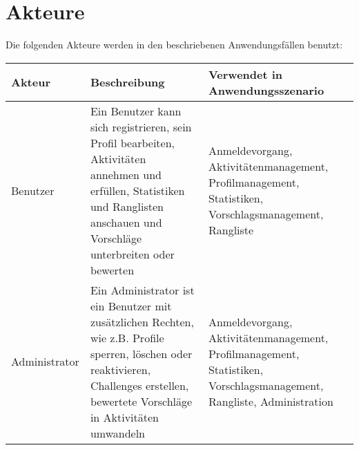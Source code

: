 \section{Akteure}
Die folgenden Akteure werden in den beschriebenen Anwendungsfällen benutzt: 

\begin{tabular}{|p{5cm}|p{5cm}|p{5cm}}
\hline Akteur & Beschreibung & Verwendet in Anwendungsszenario \\
\hline Benutzer & Ein Benutzer kann sich registrieren, sein Profil bearbeiten, Aktivitäten annehmen und erfüllen, Statistiken und Ranglisten anschauen und Vorschläge unterbreiten oder bewerten & Anmeldevorgang, Aktivitätenmanagement, Profilmanagement, Statistiken, Vorschlagsmanagement, Rangliste \\
\hline Administrator & Ein Administrator ist ein Benutzer mit zusätzlichen Rechten, wie z.B. Profile sperren, löschen oder reaktivieren, Challenges erstellen, bewertete Vorschläge in Aktivitäten umwandeln & Anmeldevorgang, Aktivitätenmanagement, Profilmanagement, Statistiken, Vorschlagsmanagement, Rangliste, Administration\\
\end{tabular}